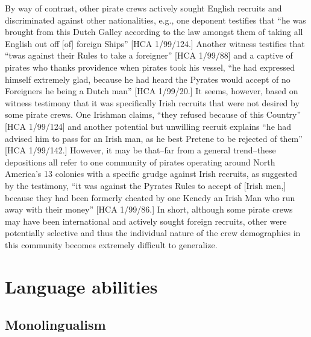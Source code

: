 By way of contrast, other pirate crews actively sought English recruits and discriminated against other nationalities, e.g., one deponent testifies that “he was brought from this Dutch Galley according to the law amongst them of taking all English out off [of]   foreign Ships” [HCA 1/99/124.] Another witness testifies that “twas against their Rules to take a foreigner” [HCA 1/99/88] and a captive of pirates who thanks providence when pirates took his vessel, “he had expressed himself extremely glad, because he had heard the Pyrates would accept of no Foreigners he being a Dutch man” [HCA 1/99/20.] It seems, however, based on witness testimony that it was specifically Irish recruits that were not desired by some pirate crews. One Irishman claims, “they refused because of this Country” [HCA 1/99/124] and another potential but unwilling recruit explains “he had advised him to pass for an Irish man, as he best Pretene to be rejected of them” [HCA 1/99/142.] However, it may be that--far from a general trend--these depositions all refer to one community of pirates operating around North America’s 13 colonies with a specific grudge against Irish recruits, as suggested by the testimony, “it was against the Pyrates Rules to accept of [Irish men,] because they had been formerly cheated by one Kenedy an Irish Man who run away with their money” [HCA 1/99/86.] In short, although some pirate crews may have been international and actively sought foreign recruits, other were potentially selective and thus the individual nature of the crew demographics in this community becomes extremely difficult to generalize.  

\section{{Language} {abilities} }%

\subsection{{Monolingualism}}%

